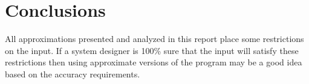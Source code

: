 \section{Conclusions}
All approximations presented and analyzed in this report place some restrictions on the input. If a system designer is 100\% sure that the input will satisfy these restrictions then using approximate versions of the program may be a good idea based on the accuracy requirements. 

